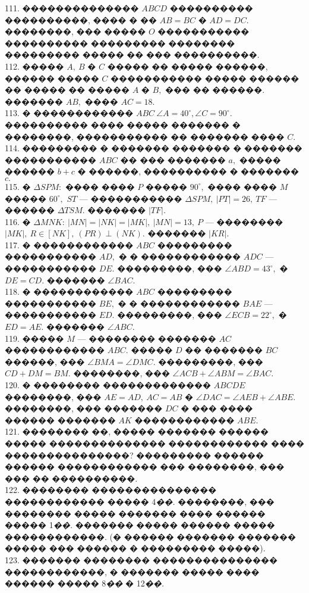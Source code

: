 \documentclass[12pt]{article}
\begin{document}
111. �������������� $ABCD$ ���������� ����������, ���� � �� $AB=BC$ � $AD=DC.$ ��������, ��� ����� $O$ ����������� ���������� ��������� �������� ��������� ����� �� ��� ����������. \\
112. ����� $A,\ B$ � $C$ ����� �� ����� ������, ������ ����� $C$ ����������� ����� ������ �� ����� �� ����� $A$ � $B,$ ��� �� ������. ������� $AB,$ ���� $AC=18.$\\
113. � ������������ $ABC\ \angle A=40^\circ, \angle C=90^\circ.$ ���������� ���� ����� ������� � ��������, ����������� �� ������� ���� $C.$\\
114. ��������� � ������� ������� � ������� ����������� $ABC$ �� ��� ������� $a,$ ����� ������ $b+c$ � ������, ���������� � ������� $c.$\\
115. � $\Delta SPM:$ ���� ���� $P$ ����� $90^\circ,$ ���� ���� $M$ ����� $60^\circ,$ $ST$ --- ����������� $\Delta SPM,\ |PT|=26,\ TF$ --- ������ $\Delta TSM.$ ������� $|TF|.$\\
116. � $\Delta MNK:\ |MN|=|NK|=|MK|,\ |MN|=13,\ P$ --- �������� $|MK|,\ R\in[NK],\ (PR)\perp(NK).$ ������� $|KR|.$\\
117. � ������������ $ABC$ ��������� ����������� $AD,$ � � ������������ $ADC$ --- ����������� $DE.$ ���������, ��� $\angle ABD=43^\circ,$ � $DE=CD.$ ������� $\angle BAC.$\\
118. � ������������ $ABC$ ��������� ����������� $BE,$ � � ������������ $BAE$ --- ����������� $ED.$ ���������, ��� $\angle ECB=22^\circ,$ � $ED=AE.$ ������� $\angle ABC.$\\
119. ����� $M$ --- �������� ������� $AC$ ������������ $ABC.$ ����� $D$ �� ������� $BC$ ������, ��� $\angle BMA=\angle DMC.$ ���������, ��� $CD+DM=BM.$ ��������, ��� $\angle ACB+\angle ABM=\angle BAC.$\\
120. � �������� ������������� $ABCDE$ ��������, ��� $AE=AD,\ AC=AB$ � $\angle DAC=\angle AEB+\angle ABE.$ ��������, ��� ������� $DC$ � ��� ���� ������ ������� $AK$ ������������ $ABE.$\\
121. �������� ��, ����� ������� ������ ����� �������������� ������������ ���� ���������������? ��������� ������ ������ ������������ ��� ��������, ��� ��� �� ����������.\\
122. �������� ��������������� ������������ ����� 4{\it ��.} ��������, ��� �������� ����� ������� ���� ������ ����� 1{\it ��.} ������� ����� ������ ����� ������������. (� ������ ������� ������� ����� ��� ������ � ��������� �����).\\
123. ������� �������� ��������������� ������������, � ������� ����� ���� ������ ����� 8{\it ��} � 12{\it ��.}\\
\end{document}
